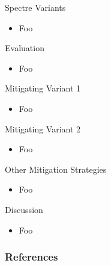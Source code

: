 \documentclass[10pt, dvipsnames, aspectratio=169]{beamer}
\begin{document}
\begin{frame}[c]{Spectre Variants}
  \begin{itemize}
    \item Foo
  \end{itemize}
\end{frame}

\begin{frame}[c]{Evaluation}
  \begin{itemize}
    \item Foo
  \end{itemize}
\end{frame}

\begin{frame}[c]{Mitigating Variant 1}
  \begin{itemize}
    \item Foo
  \end{itemize}
\end{frame}

\begin{frame}[c]{Mitigating Variant 2}
  \begin{itemize}
    \item Foo
  \end{itemize}
\end{frame}

\begin{frame}[c]{Other Mitigation Strategies}
  \begin{itemize}
    \item Foo
  \end{itemize}
\end{frame}

\begin{frame}[c]{Discussion}
  \begin{itemize}
    \item Foo
  \end{itemize}
\end{frame}

\appendix

\nocite{*}
\begin{frame}
  \frametitle{References}
  \sloppy
  \printbibliography
\end{frame}
\end{document}
